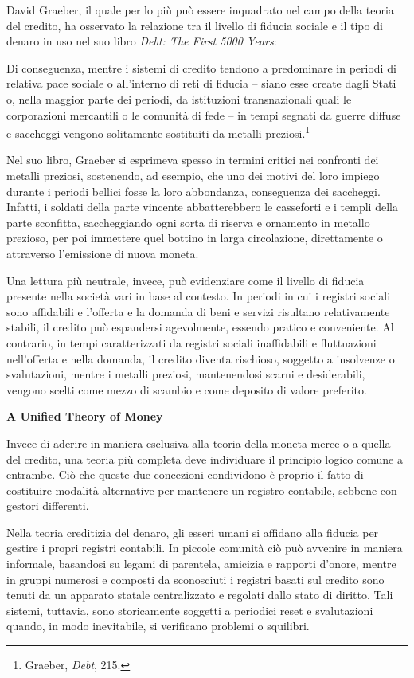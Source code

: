 \documentclass[
  a5paper,
  smalldemyvopaper,10pt,twoside,onecolumn,openright,extrafontsizes,hidelinks]{memoir}
\begin{document}
David Graeber, il quale per lo più può essere inquadrato nel campo della
teoria del credito, ha osservato la relazione tra il livello di fiducia
sociale e il tipo di denaro in uso nel suo libro \emph{Debt: The First
5000 Years}:

Di conseguenza, mentre i sistemi di credito tendono a predominare in
periodi di relativa pace sociale o all'interno di reti di fiducia --
siano esse create dagli Stati o, nella maggior parte dei periodi, da
istituzioni transnazionali quali le corporazioni mercantili o le
comunità di fede -- in tempi segnati da guerre diffuse e saccheggi
vengono solitamente sostituiti da metalli preziosi.\footnote{Graeber,
  \emph{Debt}, 215.}

Nel suo libro, Graeber si esprimeva spesso in termini critici nei
confronti dei metalli preziosi, sostenendo, ad esempio, che uno dei
motivi del loro impiego durante i periodi bellici fosse la loro
abbondanza, conseguenza dei saccheggi. Infatti, i soldati della parte
vincente abbatterebbero le casseforti e i templi della parte sconfitta,
saccheggiando ogni sorta di riserva e ornamento in metallo prezioso, per
poi immettere quel bottino in larga circolazione, direttamente o
attraverso l'emissione di nuova moneta.

Una lettura più neutrale, invece, può evidenziare come il livello di
fiducia presente nella società vari in base al contesto. In periodi in
cui i registri sociali sono affidabili e l'offerta e la domanda di beni
e servizi risultano relativamente stabili, il credito può espandersi
agevolmente, essendo pratico e conveniente. Al contrario, in tempi
caratterizzati da registri sociali inaffidabili e fluttuazioni
nell'offerta e nella domanda, il credito diventa rischioso, soggetto a
insolvenze o svalutazioni, mentre i metalli preziosi, mantenendosi
scarni e desiderabili, vengono scelti come mezzo di scambio e come
deposito di valore preferito.

\textbf{A Unified Theory of Money}

Invece di aderire in maniera esclusiva alla teoria della moneta-merce o
a quella del credito, una teoria più completa deve individuare il
principio logico comune a entrambe. Ciò che queste due concezioni
condividono è proprio il fatto di costituire modalità alternative per
mantenere un registro contabile, sebbene con gestori differenti.

Nella teoria creditizia del denaro, gli esseri umani si affidano alla
fiducia per gestire i propri registri contabili. In piccole comunità ciò
può avvenire in maniera informale, basandosi su legami di parentela,
amicizia e rapporti d'onore, mentre in gruppi numerosi e composti da
sconosciuti i registri basati sul credito sono tenuti da un apparato
statale centralizzato e regolati dallo stato di diritto. Tali sistemi,
tuttavia, sono storicamente soggetti a periodici reset e svalutazioni
quando, in modo inevitabile, si verificano problemi o squilibri.
\end{document}
